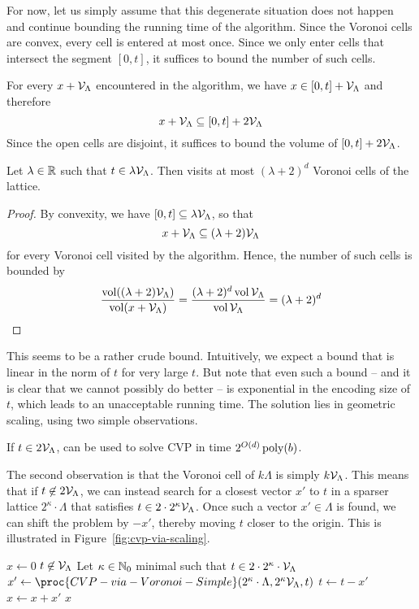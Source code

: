 For now, let us simply assume that this degenerate situation does not happen
and continue bounding the running time of the algorithm.
Since the Voronoi cells are convex, every cell is entered at most once.
Since we only enter cells that intersect the segment $[0,t]$,
it suffices to bound the number of such cells.

For every $x + \mathcal{V}_\Lambda$ encountered in the algorithm,
we have $x \in [0,t] + \mathcal{V}_\Lambda$
and therefore
\[
  x + \mathcal{V}_\Lambda \subseteq [0,t] + 2 \mathcal{V}_\Lambda
\]
Since the open cells are disjoint,
it suffices to bound the volume of $[0,t] + 2 \mathcal{V}_\Lambda$.
\begin{lemma}
  Let $\lambda \in \mathbb{R}$ such that $t \in \lambda \mathcal{V}_\Lambda$.
  Then  visits at most $(\lambda+2)^d$ Voronoi cells of the lattice.
\end{lemma}
\begin{proof}
  By convexity, we have $[0,t] \subseteq \lambda \mathcal{V}_\Lambda$,
  so that
  \[
    x + \mathcal{V}_\Lambda \subseteq (\lambda + 2) \mathcal{V}_\Lambda
  \]
  for every Voronoi cell visited by the algorithm.
  Hence, the number of such cells is bounded by
  \[
    \frac{\operatorname{vol}((\lambda + 2) \mathcal{V}_\Lambda)}{\operatorname{vol}(x + \mathcal{V}_\Lambda)}
      = \frac{(\lambda + 2)^d \operatorname{vol} \mathcal{V}_\Lambda }{\operatorname{vol} \mathcal{V}_\Lambda}
      = (\lambda + 2)^d \qedhere
  \]
\end{proof}
This seems to be a rather crude bound.
Intuitively, we expect a bound that is linear in the norm of $t$ for very large $t$.
But note that even such a bound -- and it is clear that we cannot possibly do better --
is exponential in the encoding size of $t$, which leads to an unacceptable running time.
The solution lies in geometric scaling, using two simple observations.
\begin{corollary}
  If $t \in 2\mathcal{V}_\Lambda$,
   can be used to solve CVP in time $2^{O(d)} \operatorname{poly}(b)$.
\end{corollary}

The second observation is that the Voronoi cell of $k \Lambda$ is simply $k \mathcal{V}_\Lambda$.
This means that if $t \not\in 2\mathcal{V}_\Lambda$,
we can instead search for a closest vector $x'$ to $t$
in a sparser lattice $2^\kappa \cdot \Lambda$
that satisfies $t \in 2 \cdot 2^\kappa \mathcal{V}_\Lambda$.
Once such a vector $x' \in \Lambda$ is found,
we can shift the problem by $-x'$,
thereby moving $t$ closer to the origin.
This is illustrated in Figure~\ref{fig:cvp-via-scaling}.

\begin{codebox}
  \li $x \gets 0$
  \li \While $t \not\in \mathcal{V}_\Lambda$
  \li \Do Let $\kappa \in \mathbb{N}_0$ minimal such that $t \in 2\cdot 2^\kappa \cdot \mathcal{V}_\Lambda$
  \li     $x' \gets \proc{CVP-via-Voronoi-Simple}(2^\kappa \cdot \Lambda, 2^\kappa \cV_\Lambda, t)$
  \li     $t \gets t - x'$
  \li     $x \gets x + x'$
      \End
  \li \Return $x$
\end{codebox}

